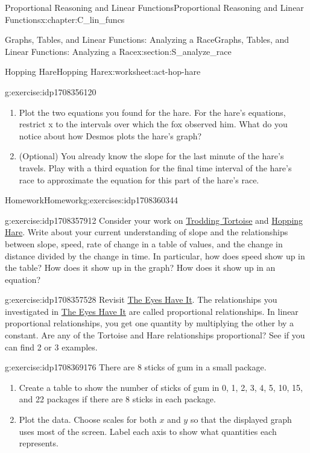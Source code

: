 \documentclass[oneside,10pt,]{book}
\numberwithin{equation}{chapter}
\begin{document}
\begin{chapterptx}{Proportional Reasoning and Linear Functions}{}{Proportional Reasoning and Linear Functions}{}{}{x:chapter:C_lin_funcs}
\begin{sectionptx}{Graphs, Tables, and Linear Functions: Analyzing a Race}{}{Graphs, Tables, and Linear Functions: Analyzing a Race}{}{}{x:section:S_analyze_race}
\begin{worksheet-subsection}{Hopping Hare}{}{Hopping Hare}{}{}{x:worksheet:act-hop-hare}
\begin{divisionexercise}{6}{}{}{g:exercise:idp1708356120}
\begin{enumerate}[font=\bfseries,label=(\alph*),ref=\alph*]
\item{}Plot the two equations you found for the hare. For the hare's equations, restrict x to the intervals over which the fox observed him. What do you notice about how Desmos plots the hare's graph?%
\item{}(Optional) You already know the slope for the last minute of the hare's travels. Play with a third equation for the final time interval of the hare's race to approximate the equation for this part of the hare's race.%
\end{enumerate}
\end{divisionexercise}%
\end{worksheet-subsection}
\restoregeometry
%
%
\typeout{************************************************}
\typeout{************************************************}
%
\begin{exercises-subsection}{Homework}{}{Homework}{}{}{g:exercises:idp1708360344}
\begin{divisionexercise}{1}{}{}{g:exercise:idp1708357912}%
Consider your work on \hyperref[x:worksheet:act-trod-tort]{Trodding Tortoise} and \hyperref[x:worksheet:act-hop-hare]{Hopping Hare}. Write about your current understanding of slope and the relationships between slope, speed, rate of change in a table of values, and the change in distance divided by the change in time. In particular, how does speed show up in the table? How does it show up in the graph? How does it show up in an equation?%
\end{divisionexercise}%
\begin{divisionexercise}{2}{}{}{g:exercise:idp1708357528}%
Revisit \hyperref[x:worksheet:act-eyes]{The Eyes Have It}. The relationships you investigated in \hyperref[x:worksheet:act-eyes]{The Eyes Have It} are called proportional relationships. In linear proportional relationships, you get one quantity by multiplying the other by a constant. Are any of the Tortoise and Hare relationships proportional? See if you can find 2 or 3 examples.%
\end{divisionexercise}%
\begin{divisionexercise}{3}{}{}{g:exercise:idp1708369176}%
There are 8 sticks of gum in a small package.%
\begin{enumerate}[font=\bfseries,label=(\alph*),ref=\alph*]
\item{}Create a table to show the number of sticks of gum in 0, 1, 2, 3, 4, 5, 10, 15, and 22 packages if there are 8 sticks in each package.%
\item{}Plot the data. Choose scales for both \(x\) and \(y\) so that the displayed graph uses most of the screen. Label each axis to show what quantities each represents.%

\end{enumerate}
\end{divisionexercise}
\end{exercises-subsection}
\end{sectionptx}
\end{chapterptx}
\end{document}
